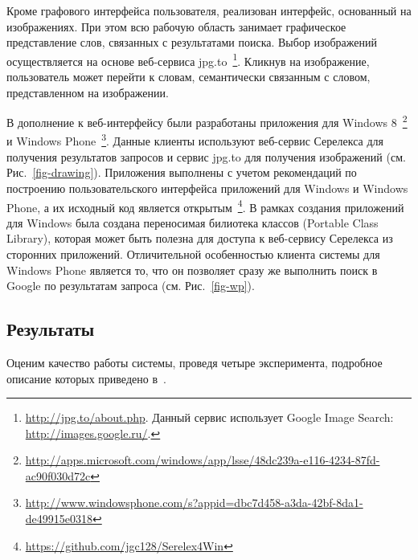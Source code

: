 \documentclass[a4paper,10pt,twoside]{article}
\begin{document}

Кроме графового интерфейса пользователя, реализован интерфейс, основанный на изображениях. При этом всю рабочую область занимает графическое представление слов, связанных с результатами поиска. Выбор изображений осуществляется на основе веб-сервиса jpg.to~\footnote{\url{http://jpg.to/about.php}. Данный сервис использует Google Image Search: \url{http://images.google.ru/}.}. Кликнув на изображение, пользователь может перейти к словам, семантически связанным с словом, представленном на изображении.


В дополнение к веб-интерфейсу были разработаны приложения для Windows 8~\footnote{\url{http://apps.microsoft.com/windows/app/lsse/48dc239a-e116-4234-87fd-ac90f030d72c}} и Windows Phone~\footnote{\url{http://www.windowsphone.com/s?appid=dbc7d458-a3da-42bf-8da1-de49915e0318}}. Данные клиенты используют веб-сервис Серелекса для получения результатов запросов и сервис jpg.to для получения изображений (см. Рис.~\ref{fig-drawing}). Приложения выполнены с учетом рекомендаций по построению пользовательского интерфейса приложений для Windows и Windows Phone, а их исходный код является открытым~\footnote{\url{https://github.com/jgc128/Serelex4Win}}. В рамках создания приложений для Windows была создана переносимая билиотека классов (Portable Class Library), которая может быть полезна для доступа к веб-сервису Серелекса из сторонних приложений. Отличительной особенностью клиента системы для Windows Phone является то, что он позволяет сразу же выполнить поиск в Google по результатам запроса (см. Рис.~\ref{fig-wp}).



\subsection{Результаты}
Оценим качество работы системы, проведя четыре эксперимента, подробное описание которых приведено в~\cite{panchenko2012konvens}.  
\end{document}
